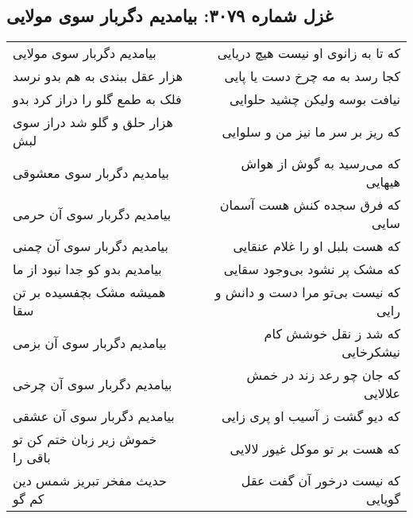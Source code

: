 \begin{center}
\section*{غزل شماره ۳۰۷۹: بیامدیم دگربار سوی مولایی}
\label{sec:3079}
\begin{longtable}{l p{0.5cm} r}
بیامدیم دگربار سوی مولایی
&&
که تا به زانوی او نیست هیچ دریایی
\\
هزار عقل ببندی به هم بدو نرسد
&&
کجا رسد به مه چرخ دست یا پایی
\\
فلک به طمع گلو را دراز کرد بدو
&&
نیافت بوسه ولیکن چشید حلوایی
\\
هزار حلق و گلو شد دراز سوی لبش
&&
که ریز بر سر ما نیز من و سلوایی
\\
بیامدیم دگربار سوی معشوقی
&&
که می‌رسید به گوش از هواش هیهایی
\\
بیامدیم دگربار سوی آن حرمی
&&
که فرق سجده کنش هست آسمان سایی
\\
بیامدیم دگربار سوی آن چمنی
&&
که هست بلبل او را غلام عنقایی
\\
بیامدیم بدو کو جدا نبود از ما
&&
که مشک پر نشود بی‌وجود سقایی
\\
همیشه مشک بچفسیده بر تن سقا
&&
که نیست بی‌تو مرا دست و دانش و رایی
\\
بیامدیم دگربار سوی آن بزمی
&&
که شد ز نقل خوشش کام نیشکرخایی
\\
بیامدیم دگربار سوی آن چرخی
&&
که جان چو رعد زند در خمش علالایی
\\
بیامدیم دگربار سوی آن عشقی
&&
که دیو گشت ز آسیب او پری زایی
\\
خموش زیر زبان ختم کن تو باقی را
&&
که هست بر تو موکل غیور لالایی
\\
حدیث مفخر تبریز شمس دین کم گو
&&
که نیست درخور آن گفت عقل گویایی
\\
\end{longtable}
\end{center}
